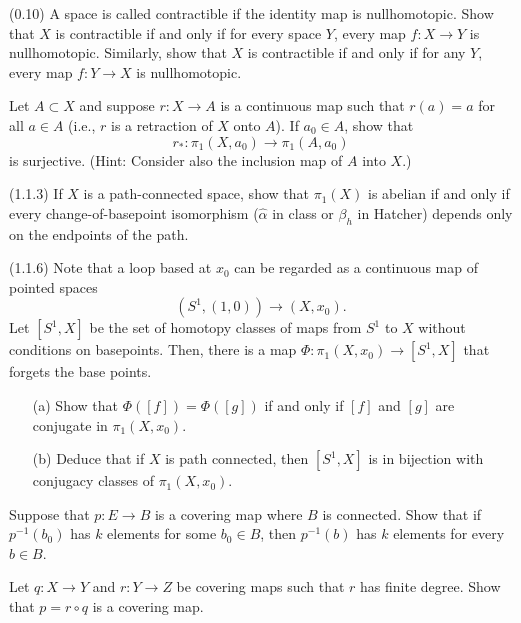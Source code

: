 \begin{problab}[1]
    (0.10) A space is called contractible if the identity map is nullhomotopic. Show that \( X \) is contractible if and only if for every space \( Y \), every map \( f : X \to Y \) is nullhomotopic. Similarly, show that \( X \) is contractible if and only if for any \( Y \), every map \( f : Y \to X \) is nullhomotopic.
    \end{problab}
    
    \begin{problab}[2]
    Let \( A \subset X \) and suppose \( r : X \to A \) is a continuous map such that \( r(a) = a \) for all \( a \in A \) (i.e., \( r \) is a retraction of \( X \) onto \( A \)). If \( a_0 \in A \), show that
    \[
    r_* : \pi_1(X, a_0) \to \pi_1(A, a_0)
    \]
    is surjective. (Hint: Consider also the inclusion map of \( A \) into \( X \).)
    \end{problab}
    
    \begin{problab}[3]
    (1.1.3) If \( X \) is a path-connected space, show that \( \pi_1(X) \) is abelian if and only if every change-of-basepoint isomorphism (\( \hat{\alpha} \) in class or \( \beta_h \) in Hatcher) depends only on the endpoints of the path.
    \end{problab}
    
    \begin{problab}[4]
    (1.1.6) Note that a loop based at \( x_0 \) can be regarded as a continuous map of pointed spaces
    \[
    (S^1, (1, 0)) \to (X, x_0).
    \]
    Let \( [S^1, X] \) be the set of homotopy classes of maps from \( S^1 \) to \( X \) without conditions on basepoints. Then, there is a map \( \Phi : \pi_1(X, x_0) \to [S^1, X] \) that forgets the base points.
    \begin{itemize}
      \item[(a)] Show that \( \Phi([f]) = \Phi([g]) \) if and only if \( [f] \) and \( [g] \) are conjugate in \( \pi_1(X, x_0) \).
      \item[(b)] Deduce that if \( X \) is path connected, then \( [S^1, X] \) is in bijection with conjugacy classes of \( \pi_1(X, x_0) \).
    \end{itemize}
    \end{problab}
    
    \begin{problab}[5]
    Suppose that \( p : E \to B \) is a covering map where \( B \) is connected. Show that if \( p^{-1}(b_0) \) has \( k \) elements for some \( b_0 \in B \), then \( p^{-1}(b) \) has \( k \) elements for every \( b \in B \).
    \end{problab}
    
    \begin{problab}[6]
    Let \( q : X \to Y \) and \( r : Y \to Z \) be covering maps such that \( r \) has finite degree. Show that \( p = r \circ q \) is a covering map.
    \end{problab}